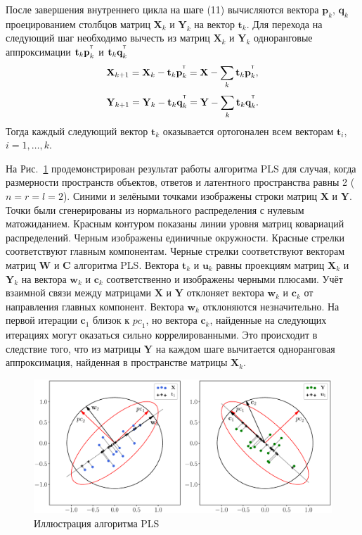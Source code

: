 \documentclass[12pt,twoside]{article}
\newcommand{\bw}{\mathbf{w}}
\newcommand{\bY}{\mathbf{Y}}
\newcommand{\bX}{\mathbf{X}}
\newcommand{\bu}{\mathbf{u}}
\newcommand{\bt}{\mathbf{t}}
\newcommand{\bp}{\mathbf{p}}
\newcommand{\bq}{\mathbf{q}}
\newcommand{\bc}{\mathbf{c}}
\newcommand{\bC}{\mathbf{C}}
\newcommand{\bW}{\mathbf{W}}
\newcommand{\T}{^{\text{\tiny\sffamily\upshape\mdseries T}}}
\begin{document}
После завершения внутреннего цикла на шаге (11) вычисляются вектора $\bp_k$, $\bq_k$ проецированием столбцов матриц $\bX_k$ и $\bY_k$ на вектор $\bt_k$. Для перехода на следующий шаг необходимо вычесть из матриц $\bX_k$ и $\bY_k$ одноранговые аппроксимации $\bt_k \bp_k^{\T}$ и $\bt_k \bq_k^{\T}$
\begin{equation*}
    \bX_{k + 1} = \bX_{k} - \bt_k \bp_k^{\T} = \bX - \sum_k \bt_k \bp_k^{\T},
\end{equation*}
\begin{equation*}
    \bY_{k + 1} = \bY_{k} - \bt_k \bq_k^{\T} = \bY - \sum_k \bt_k \bq_k^{\T}.
\end{equation*}
Тогда каждый следующий вектор $\bt_k$ оказывается ортогонален всем векторам $\bt_i$, $i=1, \dots, k$.

На Рис.~\ref{fig::PLSFigure} продемонстрирован результат работы алгоритма PLS для случая, когда размерности пространств объектов, ответов и латентного пространства равны 2 ($n = r = l = 2$).
Синими и зелёными точками изображены строки матриц $\bX$ и $\bY$. 
Точки были сгенерированы из нормального распределения с нулевым матожиданием. 
Красным контуром показаны линии уровня матриц ковариаций распределений. 
Черным изображены единичные окружности. 
Красные стрелки соответствуют главным компонентам. 
Черные стрелки соответствуют векторам матриц $\bW$ и $\bC$ алгоритма PLS. 
Вектора $\bt_k$ и $\bu_k$ равны проекциям матриц $\bX_k$ и $\bY_k$ на вектора $\bw_k$ и $\bc_k$ соответственно и изображены черными плюсами. 
Учёт взаимной связи между матрицами $\bX$ и $\bY$ отклоняет вектора $\bw_k$ и $\bc_k$ от направления главных компонент. 
Вектора $\bw_k$ отклоняются незначительно. 
На первой итерации $\bc_1$ близок к $\textit{pc}_1$, но вектора $\bc_k$, найденные на следующих итерациях могут оказаться сильно коррелированными. Это происходит в следствие того, что из матрицы $\bY$ на каждом шаге вычитается одноранговая аппроксимация, найденная в пространстве матрицы $\bX_k$.
\begin{figure}[h]
	\centering
	\includegraphics[width=\linewidth]{figs/PLSFigure.eps}
	\caption{Иллюстрация алгоритма PLS}
	\label{fig::PLSFigure}
\end{figure}
\end{document}
